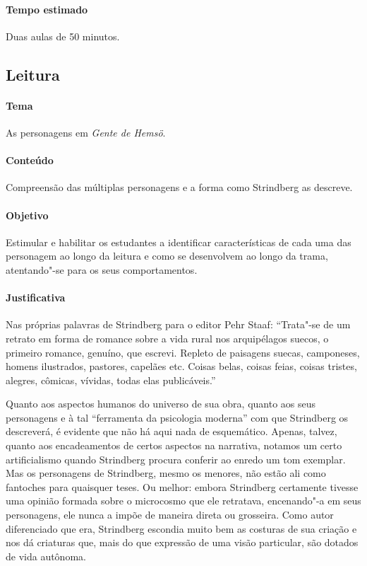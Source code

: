 \documentclass[12pt]{extarticle}
\begin{document}
\paragraph{Tempo estimado} Duas aulas de 50 minutos. 


\subsection{Leitura}


\paragraph{Tema} As personagens em \textit{Gente de Hemsö}.

\paragraph{Conteúdo} Compreensão das múltiplas personagens e a forma 
como Strindberg as descreve.

\paragraph{Objetivo} Estimular e habilitar os estudantes a identificar características 
de cada uma das personagem ao longo da leitura e como se desenvolvem ao longo da trama,
atentando"-se para os seus comportamentos. 

\paragraph{Justificativa} Nas próprias palavras de Strindberg para o editor Pehr
Staaf: ``Trata"-se de um retrato em forma de romance sobre a vida rural nos
arquipélagos suecos, o primeiro romance, genuíno, que escrevi.
Repleto de paisagens suecas, camponeses, homens ilustrados,
pastores, capelães etc. Coisas belas, coisas feias, coisas tristes,
alegres, cômicas, vívidas, todas elas publicáveis.''

Quanto aos aspectos humanos do universo de sua obra, quanto
aos seus personagens e à tal “ferramenta da psicologia moderna”
com que Strindberg os descreverá, é evidente que
não há aqui nada de esquemático. Apenas, talvez, quanto
aos encadeamentos de certos aspectos na narrativa, notamos
um certo artificialismo quando Strindberg procura conferir
ao enredo um tom exemplar. Mas os personagens de
Strindberg, mesmo os menores, não estão ali como fantoches para quaisquer teses. 
Ou melhor: embora Strindberg certamente tivesse uma opinião formada sobre o 
microcosmo que ele retratava, encenando"-a em seus personagens,
ele nunca a impõe de maneira direta ou grosseira. Como
autor diferenciado que era, Strindberg escondia muito bem
as costuras de sua criação e nos dá criaturas que, mais do
que expressão de uma visão particular, são dotados de vida
autônoma.
\end{document}
